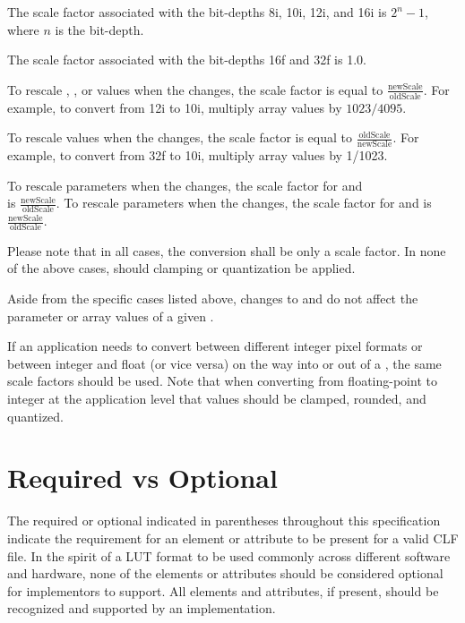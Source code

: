 The scale factor associated with the bit-depths 8i, 10i, 12i, and 16i is $2^n-1$, where $n$ is the bit-depth.

The scale factor associated with the bit-depths 16f and 32f is 1.0.

To rescale , , or   values when the  changes, the scale factor is equal to $\frac{\mathrm{newScale}}{\mathrm{oldScale}}$. For example, to convert from 12i to 10i, multiply array values by $1023/4095$.

To rescale   values when the  changes, the scale factor is equal to $\frac{\mathrm{oldScale}}{\mathrm{newScale}}$. For example, to convert from 32f to 10i, multiply array values by 1/1023.

To rescale  parameters when the  changes, the scale factor for  and \\  is $\frac{\mathrm{newScale}}{\mathrm{oldScale}}$. To rescale  parameters when the  changes, the scale factor for  and  is $\frac{\mathrm{newScale}}{\mathrm{oldScale}}$.

Please note that in all cases, the conversion shall be only a scale factor. In none of the above cases, should clamping or quantization be applied.

Aside from the specific cases listed above, changes to  and  do not affect the parameter or array values of a given .

If an application needs to convert between different integer pixel formats or between integer and float (or vice versa) on the way into or out of a , the same scale factors should be used. Note that when converting from floating-point to integer at the application level that values should be clamped, rounded, and quantized.


\section{Required vs Optional}
The required or optional indicated in parentheses throughout this specification indicate the requirement for an element or attribute to be present for a valid CLF file. In the spirit of a LUT format to be used commonly across different software and hardware, none of the elements or attributes should be considered optional for implementors to support. All elements and attributes, if present, should be recognized and supported by an implementation.

